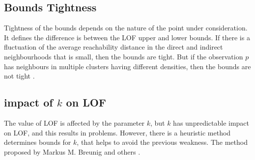 \subsection{Bounds Tightness} Tightness of the bounds depends on the nature of the point under consideration. It defines the difference is between the LOF upper and lower bounds. If there is a fluctuation of the average reachability distance in the direct and indirect neighbourhoods that is small, then the bounds are tight. But if the observation $p$ has neighbours in multiple clusters having different densities, then the bounds are not tight \citep{Markus}.
\subsection{impact of $k$ on LOF} The value of LOF is affected by the parameter $k$, but $k$ has unpredictable impact on LOF, and this results in problems. However, there is a heuristic method determines bounds for $k$, that helps to avoid the previous weakness. The method proposed by Markus M. Breunig and others \citep{Markus}.


